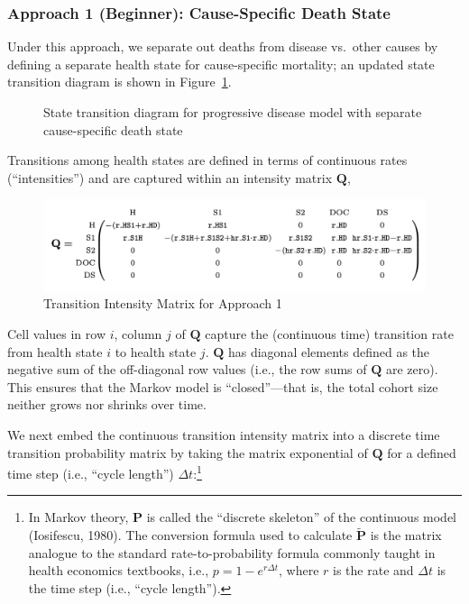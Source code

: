 \documentclass[
]{agujournal2019}
\begin{document}
\subsubsection{Approach 1 (Beginner): Cause-Specific Death
State}\label{approach-1-beginner-cause-specific-death-state}

Under this approach, we separate out deaths from disease vs.~other
causes by defining a separate health state for cause-specific mortality;
an updated state transition diagram is shown in
Figure~\ref{fig-modelDS}.

\begin{figure}


\caption{\label{fig-modelDS}State transition diagram for progressive
disease model with separate cause-specific death state}

\end{figure}%

Transitions among health states are defined in terms of continuous rates
(``intensities'') and are captured within an intensity matrix
\(\mathbf{Q}\),

\begin{figure}[H]

{\centering \includegraphics{images/Q_model2.png}

}

\caption{Transition Intensity Matrix for Approach 1}

\end{figure}%

Cell values in row \(i\), column \(j\) of \(\mathbf{Q}\) capture the
(continuous time) transition rate from health state \(i\) to health
state \(j\). \(\mathbf{Q}\) has diagonal elements defined as the
negative sum of the off-diagonal row values (i.e., the row sums of
\(\mathbf{Q}\) are zero). This ensures that the Markov model is
``closed''---that is, the total cohort size neither grows nor shrinks
over time.

We next embed the continuous transition intensity matrix into a discrete
time transition probability matrix by taking the matrix exponential of
\(\mathbf{Q}\) for a defined time step (i.e., ``cycle length'')
\(\Delta t\):\footnote{In Markov theory, \(\mathbf{P}\) is called the
  ``discrete skeleton'' of the continuous model (Iosifescu, 1980). The
  conversion formula used to calculate \(\widetilde{\mathbf{P}}\) is the
  matrix analogue to the standard rate-to-probability formula commonly
  taught in health economics textbooks, i.e., \(p = 1 - e^{r\Delta t}\),
  where \(r\) is the rate and \(\Delta t\) is the time step (i.e.,
  ``cycle length'').}
\end{document}
